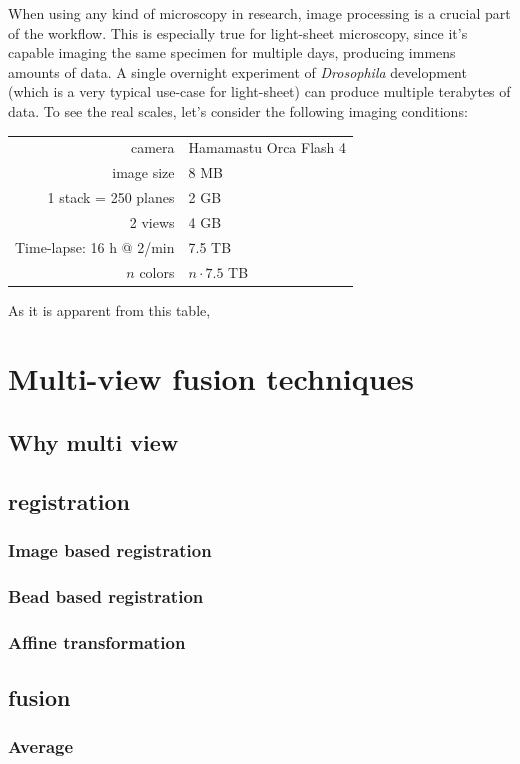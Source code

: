 \documentclass{diploma_style}
\begin{document}
When using any kind of microscopy in research, image processing is a crucial part of the workflow. This is especially true for light-sheet microscopy, since it's capable imaging the same specimen for multiple days, producing immens amounts of data. A single overnight experiment of \textit{Drosophila} development (which is a very typical use-case for light-sheet) can produce multiple terabytes of data. To see the real scales, let's consider the following imaging conditions:
\begin{center}
\begin{tabular}{rl}
	camera & Hamamastu Orca Flash 4 \\
	image size & 8 MB \\
	1 stack = 250 planes & 2 GB \\
	2 views & 4 GB \\
	Time-lapse: 16 h @ 2/min & 7.5 TB \\
	$n$ colors & $n\cdot 7.5$ TB
\end{tabular}
\end{center}

As it is apparent from this table, 


\section{Multi-view fusion techniques}
	\subsection{Why multi view}
	
	\subsection{registration}
		\subsubsection{Image based registration}
		\subsubsection{Bead based registration}
		\subsubsection{Affine transformation}
	\subsection{fusion}
		\subsubsection{Average}
\end{document}
